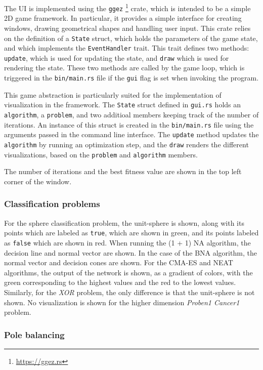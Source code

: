 The UI is implemented using the \texttt{ggez} \footnote{\url{https://ggez.rs}} crate, which is intended to be a simple 2D game framework.
In particular, it provides a simple interface for creating windows, drawing geometrical shapes and handling user input.
This crate relies on the definition of a \texttt{State} struct, which holds the parameters of the game state, and which implements the \texttt{EventHandler} trait.
This trait defines two methods: \texttt{update}, which is used for updating the state, and \texttt{draw} which is used for rendering the state.
These two methods are called by the game loop, which is triggered in the \texttt{bin/main.rs} file if the \texttt{gui} flag is set when invoking the program.

This game abstraction is particularly suited for the implementation of visualization in the framework.
The \texttt{State} struct defined in \texttt{gui.rs} holds an \texttt{algorithm}, a \texttt{problem}, and two additioal members keeping track of the number of iterations.
An instance of this struct is created in the \texttt{bin/main.rs} file using the arguments passed in the command line interface.
The \texttt{update} method updates the \texttt{algorithm} by running an optimization step, and the \texttt{draw} renders the different visualizations, based on
the \texttt{problem} and \texttt{algorithm} members.

The number of iterations and the best fitness value are shown in the top left corner of the window.

\subsubsection{Classification problems}

For the sphere classification problem, the unit-sphere is shown, along with its points which are labeled as \texttt{true}, which are shown in green, and its points
labeled as \texttt{false} which are shown in red. When running the (1 + 1) NA algorithm, the decision line and normal vector are shown. In the case of the BNA algorithm,
the normal vector and decision cones are shown. For the CMA-ES and NEAT algorithms, the output of the network is shown, as a gradient of colors, with the green
corresponding to the highest values and the red to the lowest values.
Similarly, for the \textit{XOR} problem, the only difference is that the unit-sphere is not shown.
No visualization is shown for the higher dimension \textit{Proben1 Cancer1} problem.

\subsubsection{Pole balancing}

